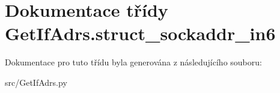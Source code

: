\hypertarget{classGetIfAdrs_1_1struct__sockaddr__in6}{\section{Dokumentace třídy Get\-If\-Adrs.\-struct\-\_\-sockaddr\-\_\-in6}
\label{d0/df7/classGetIfAdrs_1_1struct__sockaddr__in6}
}


Dokumentace pro tuto třídu byla generována z následujícího souboru\-:\begin{DoxyCompactItemize}
\item 
src/Get\-If\-Adrs.\-py\end{DoxyCompactItemize}
